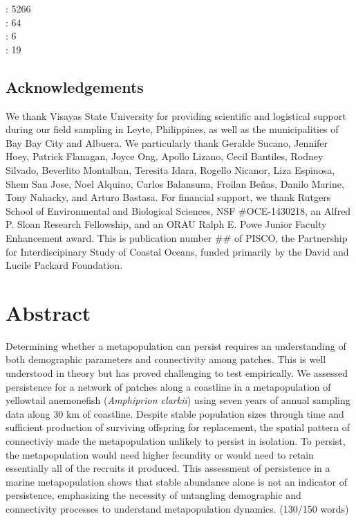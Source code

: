 \documentclass[12pt, oneside]{article}   	%
\begin{document}
: 5266 \\ 

: 64 \\ 

: 6 \\ 

: 19 \\ 

\subsection*{Acknowledgements}
We thank Visayas State University for providing scientific and logistical support during our field sampling in Leyte, Philippines, as well as the municipalities of Bay Bay City and Albuera. We particularly thank Geralde Sucano, Jennifer Hoey, Patrick Flanagan, Joyce Ong, Apollo Lizano, Cecil Bantiles, Rodney Silvado, Beverlito Montalban, Teresita Idara, Rogello Nicanor, Liza Espinosa, Shem San Jose, Noel Alquino, Carlos Balansuna, Froilan Beñas, Danilo Marine, Tony Nahacky, and Arturo Bastasa. For financial support, we thank Rutgers School of Environmental and Biological Sciences, NSF \#OCE-1430218, an Alfred P. Sloan Research Fellowship, and an ORAU Ralph E. Powe Junior Faculty Enhancement award. This is publication number \#\# of PISCO, the Partnership for Interdiscipinary Study of Coastal Oceans, funded primarily by the David and Lucile Packard Foundation.

\bigskip

\section*{Abstract}
Determining whether a metapopulation can persist requires an understanding of both demographic parameters and connectivity among patches. This is well understood in theory but has proved challenging to test empirically. We assessed persistence for a network of patches along a coastline in a metapopulation of yellowtail anemonefish (\textit{Amphiprion clarkii}) using seven years of annual sampling data along 30 km of coastline. Despite stable population sizes through time and sufficient production of surviving offspring for replacement, the spatial pattern of connectiviy made the metapopulation unlikely to persist in isolation. To persist, the metapopulation would need higher fecundity or would need to retain essentially all of the recruits it produced. This assessment of persistence in a marine metapopulation shows that stable abundance alone is not an indicator of persistence, emphasizing the necessity of untangling demographic and connectivity processes to understand metapopulation dynamics. (130/150 words) %
\end{document}
